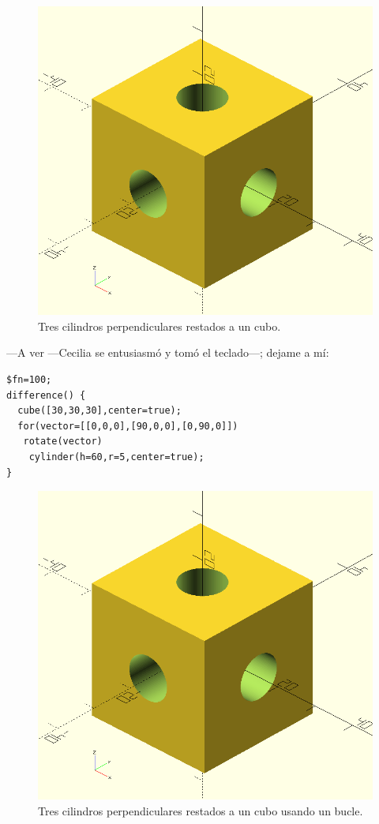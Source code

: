     \begin{figure}[ht]
      \centering
      \includegraphics[width=.5\textwidth]{imagenes/diferencia-cubo-cilindros}      
      \caption{Tres cilindros perpendiculares restados a un cubo.}
      \label{fig:diferencia-cubo-cilindros}
    \end{figure}


    ---A ver ---Cecilia se entusiasmó y tomó el teclado---; dejame a
    mí:

    \begin{lstlisting}
$fn=100;
difference() {
  cube([30,30,30],center=true);
  for(vector=[[0,0,0],[90,0,0],[0,90,0]])
   rotate(vector)
    cylinder(h=60,r=5,center=true);
}
    \end{lstlisting}%

    \begin{figure}[ht]
      \centering
      \includegraphics[width=.5\textwidth]{imagenes/diferencia-cubo-cilindros}      
      \caption{Tres cilindros perpendiculares restados a un cubo usando un bucle.}
      \label{fig:diferencia-cubo-cilindros-bucle}
    \end{figure}
    



